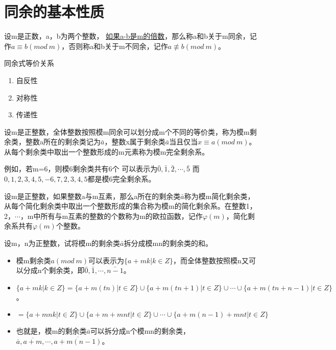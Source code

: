 \documentclass[cn,10pt]{elegantbook}
\begin{document}
\section{同余的基本性质}
\begin{definition}
  设m是正数，a，b为两个整数， \uline{如果a-b是m的倍数}，那么称a和b关于m同余，记作$a \equiv b(mod\ m)$，否则称a和b关于m不同余，记作$a \not\equiv b(mod \ m )$。
\end{definition}
\begin{theorem}
  同余式等价关系
  \begin{enumerate}
    \item 自反性
    \item 对称性
    \item 传递性
  \end{enumerate}
\end{theorem}
\begin{definition}
  设m是正整数，全体整数按照模m同余可以划分成m个不同的等价类，称为模m剩余类，整数a所在的剩余类记为$\bar{a}$，整数x属于剩余类$\bar{a}$当且仅当$x \equiv a(mod \ m)$。从每个剩余类中取出一个整数形成的m元素称为模m完全剩余系。
\end{definition}
例如，若m=6，则模6剩余类共有6个
可以表示为$\bar{0},\bar{1},\bar{2},\cdots ,\bar{5} $
而${0,1,2,3,4,5},{-6,7,2,3,4,5}$都是模6完全剩余系。
\begin{definition}
  设m是正整数，如果整数a与m互素，那么a所在的剩余类$\bar{a}$称为模m简化剩余类，从每个简化剩余类中取出一个整数形成的集合称为模m的简化剩余系。在整数1，2，$\cdots $，m中所有与m互素的整数的个数称为m的欧拉函数，记作$ \varphi (m)$，简化剩余系共有$ \varphi (m)$个整数。
\end{definition}
\begin{example}
  设m，n为正整数，试将模m的剩余类$\bar{a}$拆分成模mn的剩余类的和。
\end{example}
\begin{solution}
  \begin{itemize}
    \item 模m剩余类$a(mod \ m)$可以表示为$\{a+mk|k \in Z\}$，而全体整数按照模n又可以分成n个剩余类，即$\bar{0},\bar{1},\cdots,\bar{n-1}$。
    \item $\{ a+mk | k \in Z\}=\{a+m(tn)|t \in Z\} \cup \{a+m(tn+1)|t \in Z\} \cup \cdots \cup \{a+m(tn+n-1)| t \in Z\} $。
    \item $ = \{a+mnk|t \in Z\} \cup \{a+m+mnt| t \in Z\} \cup \cdots \cup \{a+m(n-1)+mnt | t \in Z\}$
    \item 也就是，模m的剩余类$\overline{a}$可以拆分成n个模mn的剩余类，$\overline{a} ,\overline{a+m} ,\cdots,\overline{a+m(n-1)} $。
  \end{itemize}
\end{solution}
\end{document}
